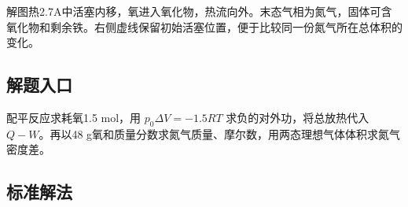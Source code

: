 \documentclass[UTF8,fontset=fandol,a4paper,11pt]{ctexart}
\begin{document}
解图热2.7A中活塞内移，氧进入氧化物，热流向外。末态气相为氮气，固体可含氧化物和剩余铁。右侧虚线保留初始活塞位置，便于比较同一份氮气所在总体积的变化。



\subsection*{解题入口}

配平反应求耗氧1.5 mol，用 $p_0\Delta V=-1.5RT$ 求负的对外功，将总放热代入 $Q-W$。再以48 g氧和质量分数求氮气质量、摩尔数，用两态理想气体体积求氮气密度差。




\subsection*{标准解法}
\end{document}
